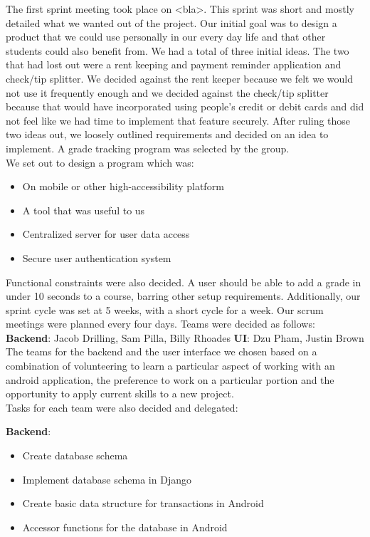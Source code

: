 \documentclass[a4paper]{article} %
\begin{document}
The first sprint meeting took place on <bla>. This sprint was short and mostly detailed what we wanted out of the project. Our initial goal was to design a product that we could use personally in our every day life and that other students could also benefit from. We had a total of three initial ideas. The two that had lost out were a rent keeping and payment reminder application and check/tip splitter. We decided against the rent keeper because we felt we would not use it frequently enough and we decided against the check/tip splitter because that would have incorporated using people's credit or debit cards and did not feel like we had time to implement that feature securely. After ruling those two ideas out, we loosely outlined requirements and decided on an idea to implement. A grade tracking program was selected by the group. 
\\
We set out to design a program which was:

\begin{itemize}
  \item On mobile or other high-accessibility platform
    \item A tool that was useful to us
    \item Centralized server for user data access
    \item Secure user authentication system
\end{itemize}

Functional constraints were also decided. A user should be able to add a grade in under 10 seconds to a course, barring other setup requirements. Additionally, our sprint cycle was set at 5 weeks, with a short cycle for a week. Our scrum meetings were planned every four days. Teams were decided as follows: \\
 
\textbf{Backend}: Jacob Drilling, Sam Pilla, Billy Rhoades
\textbf{UI}: Dzu Pham, Justin Brown \\

The teams for the backend and the user interface we chosen based on a combination of volunteering to learn a particular aspect of working with an android application, the preference to work on a particular portion and the opportunity to apply current skills to a new project. 
\\

Tasks for each team were also decided and delegated:

\textbf{Backend}:
\begin{itemize}
  \item Create database schema
    \item Implement database schema in Django
    \item Create basic data structure for transactions in Android
    \item Accessor functions for the database in Android
%
% 
%
%
% 
%
\end{itemize}
\end{document}
